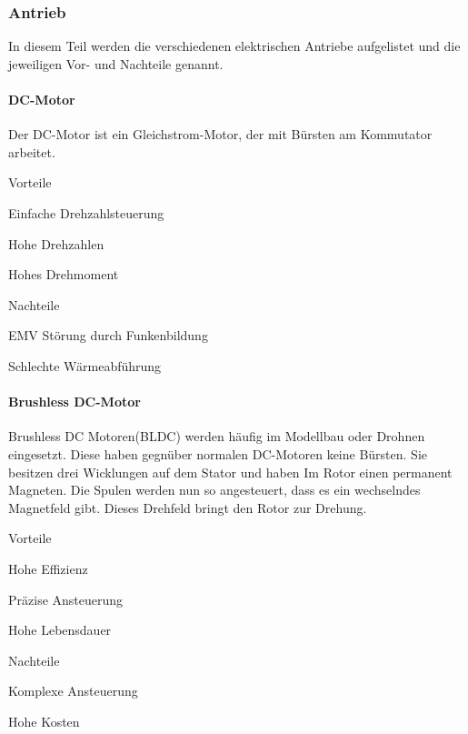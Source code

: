 \documentclass[../main.tex]{subfiles}
\begin{document}
\subsubsection{Antrieb}

In diesem Teil werden die verschiedenen elektrischen Antriebe aufgelistet und die jeweiligen Vor- und Nachteile genannt. 

\paragraph{DC-Motor}

Der DC-Motor ist ein Gleichstrom-Motor, der mit Bürsten am Kommutator arbeitet. 

\begin{minipage}[t]{0.48\textwidth}
\begin{items}
  \item [Vorteile]
  \item Einfache Drehzahlsteuerung
  \item Hohe Drehzahlen
  \item Hohes Drehmoment
\end{items}
\end{minipage}
\hfill
\begin{minipage}[t]{0.48\textwidth}
\begin{items}
  \item [Nachteile]
  \item EMV Störung durch Funkenbildung
  \item Schlechte Wärmeabführung
\end{items}
\end{minipage}

\paragraph{Brushless DC-Motor}

Brushless DC Motoren(BLDC) werden häufig im Modellbau oder Drohnen eingesetzt. Diese haben gegnüber normalen DC-Motoren keine Bürsten. Sie besitzen drei Wicklungen auf dem Stator und haben Im Rotor einen permanent Magneten. Die Spulen werden nun so angesteuert, dass es ein wechselndes Magnetfeld gibt. Dieses Drehfeld bringt den Rotor zur Drehung. 

\begin{minipage}[t]{0.48\textwidth}
\begin{items}
  \item [Vorteile]
  \item Hohe Effizienz
  \item Präzise Ansteuerung
  \item Hohe Lebensdauer
\end{items}
\end{minipage}
\hfill
\begin{minipage}[t]{0.48\textwidth}
\begin{items}
  \item [Nachteile]
  \item Komplexe Ansteuerung
  \item Hohe Kosten
\end{items}
\end{minipage}
\end{document}
